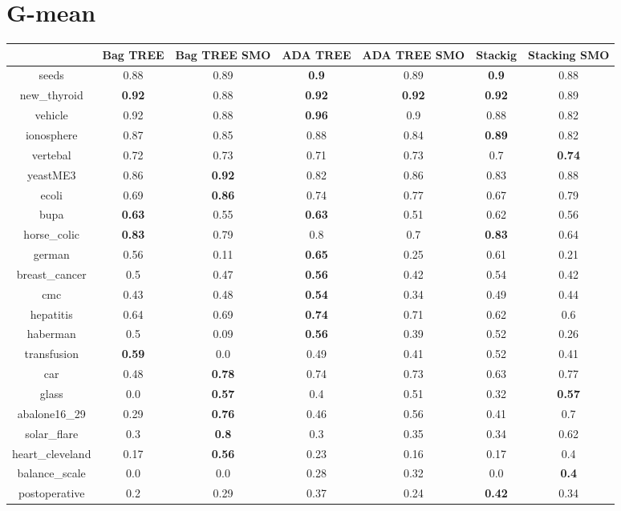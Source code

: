 \documentclass{article}%
\begin{document}
\section*{G{-}mean}%
\begin{tabular}{c|cccccc}%
&Bag TREE&Bag TREE SMO&ADA TREE&ADA TREE SMO&Stackig&Stacking SMO\\%
\hline%
seeds&0.88&0.89&\textbf{0.9}&0.89&\textbf{0.9}&0.88\\%
new\_thyroid&\textbf{0.92}&0.88&\textbf{0.92}&\textbf{0.92}&\textbf{0.92}&0.89\\%
vehicle&0.92&0.88&\textbf{0.96}&0.9&0.88&0.82\\%
ionosphere&0.87&0.85&0.88&0.84&\textbf{0.89}&0.82\\%
vertebal&0.72&0.73&0.71&0.73&0.7&\textbf{0.74}\\%
yeastME3&0.86&\textbf{0.92}&0.82&0.86&0.83&0.88\\%
ecoli&0.69&\textbf{0.86}&0.74&0.77&0.67&0.79\\%
bupa&\textbf{0.63}&0.55&\textbf{0.63}&0.51&0.62&0.56\\%
horse\_colic&\textbf{0.83}&0.79&0.8&0.7&\textbf{0.83}&0.64\\%
german&0.56&0.11&\textbf{0.65}&0.25&0.61&0.21\\%
breast\_cancer&0.5&0.47&\textbf{0.56}&0.42&0.54&0.42\\%
cmc&0.43&0.48&\textbf{0.54}&0.34&0.49&0.44\\%
hepatitis&0.64&0.69&\textbf{0.74}&0.71&0.62&0.6\\%
haberman&0.5&0.09&\textbf{0.56}&0.39&0.52&0.26\\%
transfusion&\textbf{0.59}&0.0&0.49&0.41&0.52&0.41\\%
car&0.48&\textbf{0.78}&0.74&0.73&0.63&0.77\\%
glass&0.0&\textbf{0.57}&0.4&0.51&0.32&\textbf{0.57}\\%
abalone16\_29&0.29&\textbf{0.76}&0.46&0.56&0.41&0.7\\%
solar\_flare&0.3&\textbf{0.8}&0.3&0.35&0.34&0.62\\%
heart\_cleveland&0.17&\textbf{0.56}&0.23&0.16&0.17&0.4\\%
balance\_scale&0.0&0.0&0.28&0.32&0.0&\textbf{0.4}\\%
postoperative&0.2&0.29&0.37&0.24&\textbf{0.42}&0.34\\%
\end{tabular}

%
\end{document}
